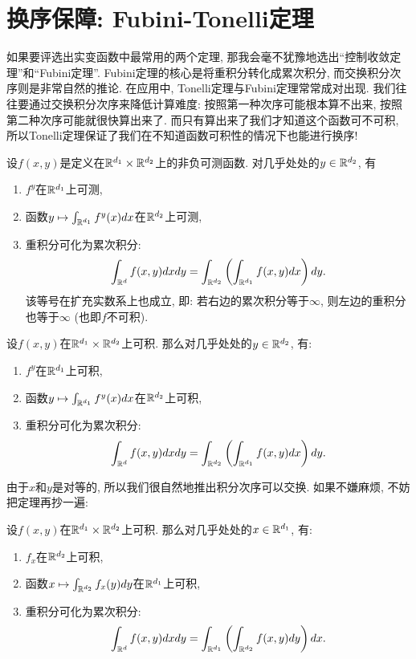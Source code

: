 \section{换序保障: Fubini-Tonelli定理}
如果要评选出实变函数中最常用的两个定理, 那我会毫不犹豫地选出“控制收敛定理”和“Fubini定理”. 
Fubini定理的核心是将重积分转化成累次积分, 而交换积分次序则是非常自然的推论. 
在应用中, Tonelli定理与Fubini定理常常成对出现. 我们往往要通过交换积分次序来降低计算难度: 按照第一种次序可能根本算不出来, 按照第二种次序可能就很快算出来了. 而只有算出来了我们才知道这个函数可不可积, 所以Tonelli定理保证了我们在不知道函数可积性的情况下也能进行换序! 
\begin{theorem}[Tonelli]
    设$f(x,y)$是定义在$\mathbb{R}^{d_1} \times \mathbb{R}^{d_2}$上的非负可测函数. 对几乎处处的$y \in \mathbb{R}^{d_2}$, 有
    \begin{enumerate}
    \item $f^y$在$\mathbb{R}^{d_1}$上可测, 
    \item 函数$y \mapsto \int_{\mathbb{R}^{d_1}} f^{y}(x)dx$在$\mathbb{R}^{d_2}$上可测,
    \item 重积分可化为累次积分:
    $$\int_{\mathbb{R}^d} f(x,y)dxdy = \int_{\mathbb{R}^{d_2}} \left(\int_{\mathbb{R}^{d_1}}f(x,y)dx\right)dy.$$
    该等号在扩充实数系上也成立, 即: 若右边的累次积分等于$\infty$, 则左边的重积分也等于$\infty$ (也即$f$不可积). 
    \end{enumerate}
\end{theorem}
\begin{theorem}[Fubini]
    设$f(x,y)$在$\mathbb{R}^{d_1} \times \mathbb{R}^{d_2}$上可积. 那么对几乎处处的$y \in \mathbb{R}^{d_2}$, 有:
    \begin{enumerate}
    \item $f^y$在$\mathbb{R}^{d_1}$上可积,
    \item 函数$y \mapsto \int_{\mathbb{R}^{d_1}} f^{y}(x)dx$在$\mathbb{R}^{d_2}$上可积,
    \item 重积分可化为累次积分:
    $$\int_{\mathbb{R}^d} f(x,y)dxdy = \int_{\mathbb{R}^{d_2}} \left(\int_{\mathbb{R}^{d_1}}f(x,y)dx\right)dy.$$
    \end{enumerate}
\end{theorem}
由于$x$和$y$是对等的, 所以我们很自然地推出积分次序可以交换. 如果不嫌麻烦, 不妨把定理再抄一遍:
\begin{theorem}[Fubini定理再抄一遍]
    设$f(x,y)$在$\mathbb{R}^{d_1} \times \mathbb{R}^{d_2}$上可积. 那么对几乎处处的$x \in \mathbb{R}^{d_1}$, 有:
    \begin{enumerate}
    \item $f_x$在$\mathbb{R}^{d_2}$上可积,
    \item 函数$x \mapsto \int_{\mathbb{R}^{d_2}} f_{x}(y)dy$在$\mathbb{R}^{d_1}$上可积,
    \item 重积分可化为累次积分:
    $$\int_{\mathbb{R}^d} f(x,y)dxdy = \int_{\mathbb{R}^{d_1}} \left(\int_{\mathbb{R}^{d_2}}f(x,y)dy\right)dx.$$
    \end{enumerate}
\end{theorem}
